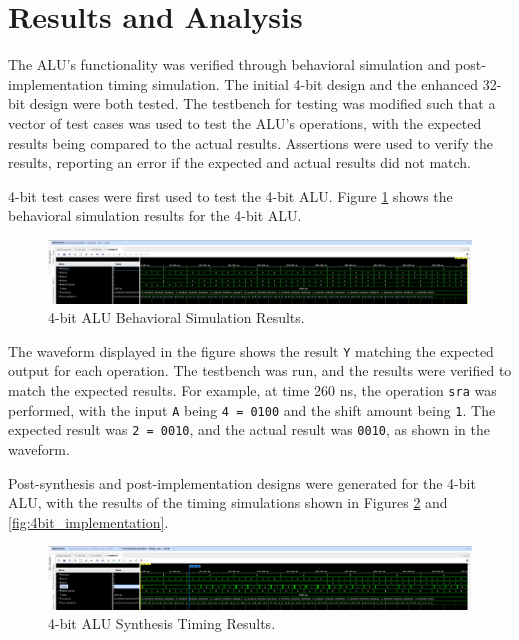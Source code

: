 \documentclass[CMPE]{KGCOEReport}
\begin{document}
\section*{Results and Analysis}

The ALU's functionality was verified through behavioral simulation and post-implementation timing simulation. The initial 4-bit design and the enhanced 32-bit design were both tested. The testbench for testing was modified such that a vector of test cases was used to test the ALU's operations, with the expected results being compared to the actual results. Assertions were used to verify the results, reporting an error if the expected and actual results did not match.

4-bit test cases were first used to test the 4-bit ALU. Figure \ref{fig:4bit_behavior} shows the behavioral simulation results for the 4-bit ALU.

\begin{figure}[H]
    \centering
    \includegraphics[width=1\textwidth]{behavior.png}
    \caption{4-bit ALU Behavioral Simulation Results.}
    \label{fig:4bit_behavior}
\end{figure}

The waveform displayed in the figure shows the result \verb|Y| matching the expected output for each operation. The testbench was run, and the results were verified to match the expected results. For example, at time 260 ns, the operation \verb|sra| was performed, with the input \verb|A| being \verb|4 = 0100| and the shift amount being \verb|1|. The expected result was \verb|2 = 0010|, and the actual result was \verb|0010|, as shown in the waveform.

Post-synthesis and post-implementation designs were generated for the 4-bit ALU, with the results of the timing simulations shown in Figures \ref{fig:4bit_synthesis} and \ref{fig:4bit_implementation}.

\begin{figure}[H]
    \centering
    \includegraphics[width=1\textwidth]{synth.png}
    \caption{4-bit ALU Synthesis Timing Results.}
    \label{fig:4bit_synthesis}
\end{figure}
\end{document}

